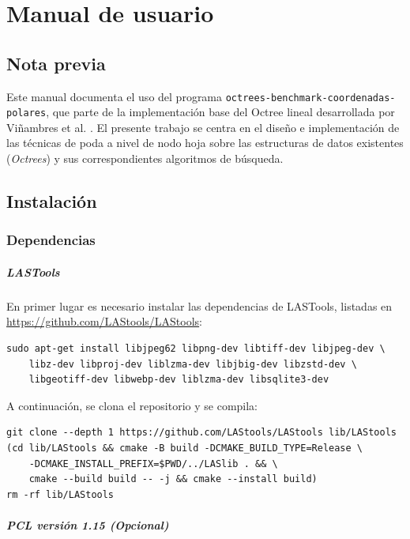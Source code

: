 \chapter{Manual de usuario}

\section*{Nota previa}

Este manual documenta el uso del programa \texttt{octrees-benchmark-coordenadas-polares}, que parte
de la implementación base del Octree lineal desarrollada por Viñambres et al. \cite{Vinambres}. El presente trabajo se centra en el
diseño e implementación de las técnicas de poda a nivel de nodo hoja
sobre las estructuras de datos existentes (\textit{Octrees}) y sus correspondientes algoritmos de búsqueda.

\section{Instalación}

\subsection{Dependencias}

\paragraph{LASTools}

En primer lugar es necesario instalar las dependencias de LASTools, listadas
en \url{https://github.com/LAStools/LAStools}:

\begin{verbatim}
sudo apt-get install libjpeg62 libpng-dev libtiff-dev libjpeg-dev \
    libz-dev libproj-dev liblzma-dev libjbig-dev libzstd-dev \
    libgeotiff-dev libwebp-dev liblzma-dev libsqlite3-dev
\end{verbatim}

A continuación, se clona el repositorio y se compila:

\begin{verbatim}
git clone --depth 1 https://github.com/LAStools/LAStools lib/LAStools
(cd lib/LAStools && cmake -B build -DCMAKE_BUILD_TYPE=Release \
    -DCMAKE_INSTALL_PREFIX=$PWD/../LASlib . && \
    cmake --build build -- -j && cmake --install build)
rm -rf lib/LAStools
\end{verbatim}

\paragraph{PCL versión 1.15 (Opcional)}

